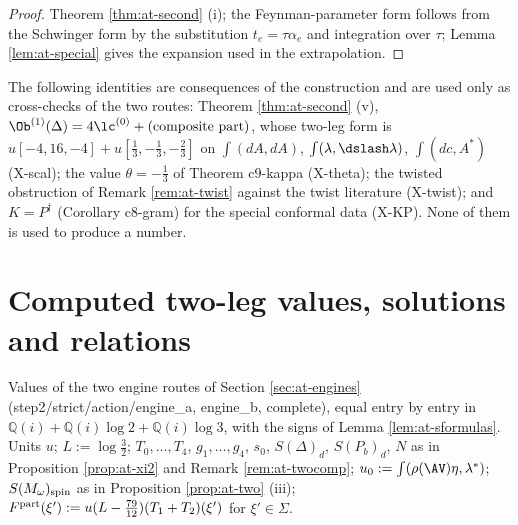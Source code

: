 \begin{proof}
Theorem \ref{thm:at-second} (i); the Feynman-parameter form follows from the Schwinger form by the substitution $t_e=\tau\alpha_e$ and integration over $\tau$; Lemma \ref{lem:at-special} gives the expansion used in the extrapolation.
\end{proof}

\begin{remark}
\label{rem:at-cross}
The following identities are consequences of the construction and are used only as cross-checks of the two routes: Theorem \ref{thm:at-second} (v), $\Ob^{(1)}(\Delta)=4\lc^{(0)}+(\text{composite part})$, whose two-leg form is $u[-4,16,-4]+u[\tfrac13,-\tfrac13,-\tfrac23]$ on $\int(dA,dA)$, $\int(\lambda,\dslash\lambda)$, $\int(dc,A^*)$ (X-scal); the value $\theta=-\tfrac13$ of Theorem c9-kappa (X-theta); the twisted obstruction of Remark \ref{rem:at-twist} against the twist literature (X-twist); and $K=P^\dagger$ (Corollary c8-gram) for the special conformal data (X-KP). None of them is used to produce a number.
\end{remark}

\section{Computed two-leg values, solutions and relations}
\label{sec:at-computed}

Values of the two engine routes of Section \ref{sec:at-engines} (step2/strict/action/engine\_a, engine\_b, complete), equal entry by entry in $\mathbb Q(i)+\mathbb Q(i)\log2+\mathbb Q(i)\log3$, with the signs of Lemma \ref{lem:at-sformulas}. Units $u$; $L:=\log\tfrac32$; $T_0,\dots,T_4$, $g_1,\dots,g_4$, $s_0$, $S(\Delta)_d$, $S(P_b)_d$, $N$ as in Proposition \ref{prop:at-xi2} and Remark \ref{rem:at-twocomp}; $u_0:=\int(\rho(\AV)\eta,\lambda^*)$; $S(M_\omega)_{\rm spin}$ as in Proposition \ref{prop:at-two} (iii); $F^{\rm part}(\xi'):=u(L-\tfrac{79}{12})(T_1+T_2)(\xi')$ for $\xi'\in\Sigma$.

